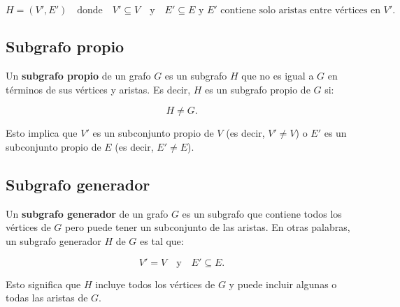 \documentclass{article}
\begin{document}
$$H = (V', E') \quad \text{donde} \quad V' \subseteq V \quad \text{y} \quad E' \subseteq E \text{ y } E' \text{ contiene solo aristas entre vértices en } V'.$$

\begin{center}
\end{center}

\subsection{Subgrafo propio}
Un \textbf{subgrafo propio} de un grafo $ G $ es un subgrafo $ H $ que no es igual a $ G $ en términos de sus vértices y aristas. Es decir, $ H $ es un subgrafo propio de $ G $ si:

$$H \neq G.$$

Esto implica que $ V' $ es un subconjunto propio de $ V $ (es decir, $ V' \neq V $) o $ E' $ es un subconjunto propio de $ E $ (es decir, $ E' \neq E $).

\begin{center}
\end{center}

\subsection{Subgrafo generador}

Un \textbf{subgrafo generador} de un grafo $ G $ es un subgrafo que contiene todos los vértices de $ G $ pero puede tener un subconjunto de las aristas. En otras palabras, un subgrafo generador $ H $ de $ G $ es tal que:

$$V' = V \quad \text{y} \quad E' \subseteq E.$$

Esto significa que $ H $ incluye todos los vértices de $ G $ y puede incluir algunas o todas las aristas de $ G $.
\end{document}
